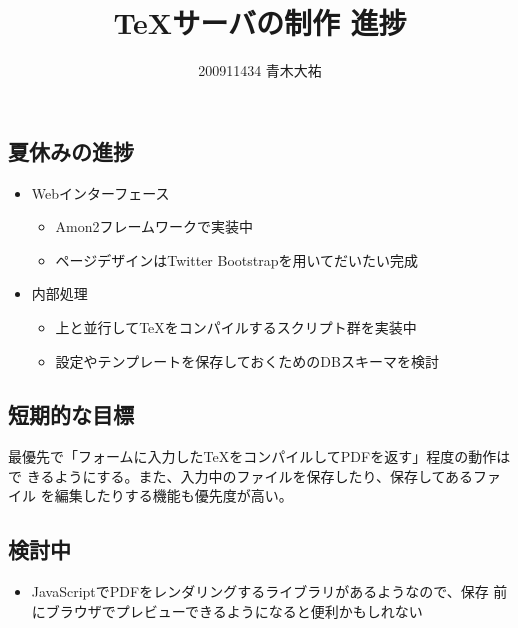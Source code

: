 \documentclass[a4paper,8pt,min]{jsarticle}
\title{TeXサーバの制作 進捗}
\author{200911434 青木大祐}
\begin{document}
\maketitle

\subsection*{夏休みの進捗}
\begin{itemize}
 \item Webインターフェース
       \begin{itemize}
        \item Amon2フレームワークで実装中
        \item ページデザインはTwitter Bootstrapを用いてだいたい完成
       \end{itemize}
\item 内部処理
      \begin{itemize}
       \item 上と並行してTeXをコンパイルするスクリプト群を実装中
       \item 設定やテンプレートを保存しておくためのDBスキーマを検討
      \end{itemize}
\end{itemize}

\subsection*{短期的な目標}
最優先で「フォームに入力したTeXをコンパイルしてPDFを返す」程度の動作はで
きるようにする。また、入力中のファイルを保存したり、保存してあるファイル
を編集したりする機能も優先度が高い。

\subsection*{検討中}
\begin{itemize}
 \item JavaScriptでPDFをレンダリングするライブラリがあるようなので、保存
       前にブラウザでプレビューできるようになると便利かもしれない
\end{itemize}
\end{document}

